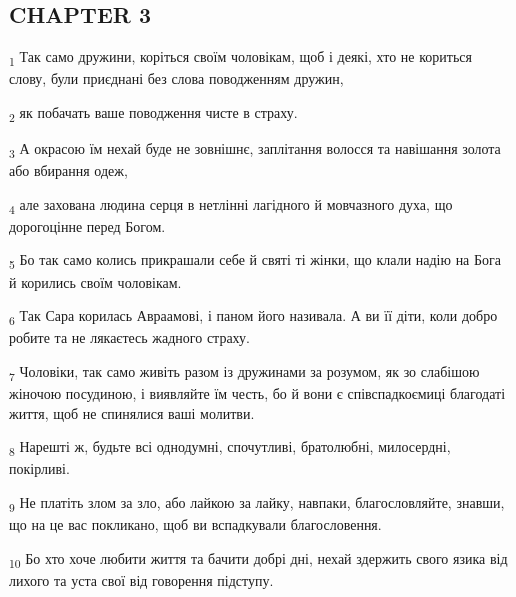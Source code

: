 \subsection{CHAPTER 3}
\begin{tcolorbox}
\textsubscript{1} Так само дружини, коріться своїм чоловікам, щоб і деякі, хто не кориться слову, були приєднані без слова поводженням дружин,
\end{tcolorbox}
\begin{tcolorbox}
\textsubscript{2} як побачать ваше поводження чисте в страху.
\end{tcolorbox}
\begin{tcolorbox}
\textsubscript{3} А окрасою їм нехай буде не зовнішнє, заплітання волосся та навішання золота або вбирання одеж,
\end{tcolorbox}
\begin{tcolorbox}
\textsubscript{4} але захована людина серця в нетлінні лагідного й мовчазного духа, що дорогоцінне перед Богом.
\end{tcolorbox}
\begin{tcolorbox}
\textsubscript{5} Бо так само колись прикрашали себе й святі ті жінки, що клали надію на Бога й корились своїм чоловікам.
\end{tcolorbox}
\begin{tcolorbox}
\textsubscript{6} Так Сара корилась Авраамові, і паном його називала. А ви її діти, коли добро робите та не лякаєтесь жадного страху.
\end{tcolorbox}
\begin{tcolorbox}
\textsubscript{7} Чоловіки, так само живіть разом із дружинами за розумом, як зо слабішою жіночою посудиною, і виявляйте їм честь, бо й вони є співспадкоємиці благодаті життя, щоб не спинялися ваші молитви.
\end{tcolorbox}
\begin{tcolorbox}
\textsubscript{8} Нарешті ж, будьте всі однодумні, спочутливі, братолюбні, милосердні, покірливі.
\end{tcolorbox}
\begin{tcolorbox}
\textsubscript{9} Не платіть злом за зло, або лайкою за лайку, навпаки, благословляйте, знавши, що на це вас покликано, щоб ви вспадкували благословення.
\end{tcolorbox}
\begin{tcolorbox}
\textsubscript{10} Бо хто хоче любити життя та бачити добрі дні, нехай здержить свого язика від лихого та уста свої від говорення підступу.
\end{tcolorbox}
